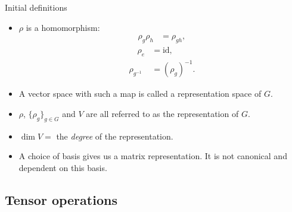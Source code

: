 \documentclass[10pt]{beamer}
\begin{document}
	\begin{frame}{Initial definitions}
		\begin{itemize}
			\item $\rho$ is a homomorphism: \begin{align*}
				\rho_g \rho_h &= \rho_{gh}, 
			\end{align*}\pause
			\begin{align*}
				\quad \rho_e &= \text{id}, \\
				\rho_{g^{-1}} &= (\rho_g)^{-1}.
			\end{align*}\pause
			\vfill
			\item A vector space with such a map is called a \alert{representation space of $G$}.\pause
			\vfill
			\item $\rho$, $\{\rho_g\}_{g\in G}$ and $V$ are all referred to as the \alert{representation of $G$.}\pause
			\vfill
			\item $\dim V =$ the \textit{degree} of the representation.\pause
			\vfill
			\item A choice of basis gives us a \alert{matrix representation}. It is not canonical and dependent on this basis.
		\end{itemize}		
	\end{frame}
	
	\subsection{Tensor operations}
	
\end{document}
